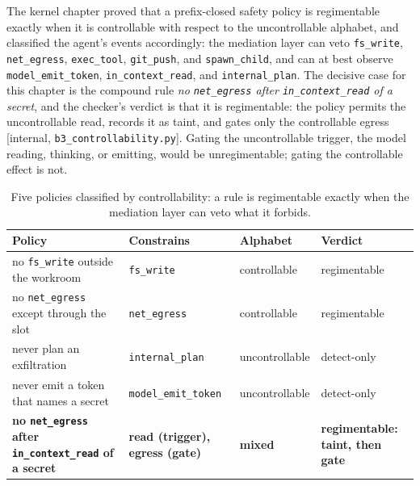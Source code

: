 \documentclass[11pt,a4paper]{article}
\theoremstyle{definition}
\begin{document}
{\sloppy The kernel chapter proved that a prefix-closed safety policy is regimentable
exactly when it is controllable with respect to the uncontrollable alphabet,
and classified the agent's events accordingly: the mediation layer can veto
\texttt{fs\_write}, \texttt{net\_egress}, \texttt{exec\_tool},
\texttt{git\_push}, and \texttt{spawn\_child}, and can at best observe
\texttt{model\_emit\_token}, \texttt{in\_context\_read}, and
\texttt{internal\_plan}. The decisive case for this chapter is the compound
rule \emph{no \texttt{net\_egress} after \texttt{in\_context\_read} of a
secret}, and the checker's verdict is that it is regimentable: the policy
permits the uncontrollable read, records it as taint, and gates only the
controllable egress [internal, \texttt{b3\_controllability.py}]. Gating the
uncontrollable trigger, the model reading, thinking, or emitting, would be
unregimentable; gating the controllable effect is not.\par}

\begin{table}[H]\centering\footnotesize
\caption{Five policies classified by controllability: a rule is regimentable
exactly when the mediation layer can veto what it forbids.}
\label{tab:sealed-policy-classification}
\begin{tabularx}{\textwidth}{@{}>{\raggedright\arraybackslash}X >{\raggedright\arraybackslash}p{2.1cm} >{\raggedright\arraybackslash}p{2.3cm} >{\raggedright\arraybackslash}p{2.1cm}@{}}
\toprule
Policy & Constrains & Alphabet & Verdict \\
\midrule
no \texttt{fs\_write} outside the workroom & \texttt{fs\_write} & controllable & regimentable \\
no \texttt{net\_egress} except through the slot & \texttt{net\_egress} & controllable & regimentable \\
never plan an exfiltration & \texttt{internal\_plan} & uncontrollable & detect-only \\
never emit a token that names a secret & \texttt{model\_emit\_token} & uncontrollable & detect-only \\
\textbf{no \texttt{net\_\allowbreak egress} after \texttt{in\_\allowbreak context\_\allowbreak read} of a secret} & \textbf{read (trigger), egress (gate)} & \textbf{mixed} & \textbf{regimentable: taint, then gate} \\
\bottomrule
\end{tabularx}
\end{table}
\end{document}
